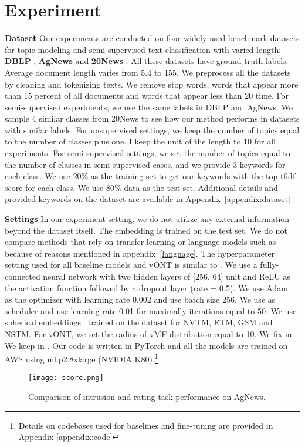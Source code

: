 \documentclass[11pt]{article}
\begin{document}
\section{Experiment}

\textbf{Dataset} Our experiments are conducted on four widely-used benchmark datasets for topic modeling and semi-supervised text classification with varied length: \textbf{DBLP} \cite{DBLP:conf/ijcai/PanWZZW16}, \textbf{AgNews} \cite{zhang2016characterlevel} and \textbf{20News} \cite{lang1995newsweeder}. All these datasets have ground truth labels. Average document length varies from 5.4 to 155. We preprocess all the datasets by cleaning and tokenizing texts. We remove stop words, words that appear more than 15 percent of all documents and words that appear less than 20 time. For semi-supervised experiments, we use the same labels in DBLP and AgNews. We sample 4 similar classes from 20News to see how our method performs in datasets with similar labels. For unsupervised settings, we keep the number of topics equal to the number of classes plus one. I keep the unit of the length to 10 for all experiments. For semi-supervised settings, we set the number of topics equal to the number of classes in semi-supervised cases, and we provide 3 keywords for each class. We use 20\% as the training set to get our keywords with the top tfidf score for each class. We use 80\% data as the test set. Additional details and provided keywords on the dataset are available in Appendix~\ref{appendix:dataset}

\textbf{Settings} In our experiment setting, we do not utilize any external information beyond the dataset itself. The embedding is trained on the test set. We do not compare methods that rely on transfer learning or language models such as \cite{Bianchi2021PretrainingIA, Yu2021FineTuningPL,Wang2021XClassTC} because of reasons mentioned in appendix~\ref{language}.
The hyperparameter setting used for all baseline models and vONT is similar to \cite{JMLR:v20:18-569}. We use a fully-connected neural network with two hidden layers of [256, 64] unit and ReLU as the activation function followed by a dropout layer (rate = 0.5). We use Adam~\cite{kingma2017adam} as the optimizer with learning rate 0.002 and use batch size 256. We use \cite{smith2018superconvergence} as scheduler and use learning rate 0.01 for maximally iterations equal to 50. We use spherical embeddings~\cite{meng2019spherical} trained on the dataset for NVTM, ETM, GSM and NSTM. For vONT, we set the radius of vMF distribution equal to 10. We fix  in  . We keep  in .    
Our code is written in PyTorch and all the models are trained on AWS using ml.p2.8xlarge (NVIDIA K80).\footnote{Details on codebases used for baselines and fine-tuning are provided in Appendix  \ref{appendix:code}}
\begin{figure}
\centering
\texttt{[image: score.png]}
\caption{Comparison of intrusion and rating task performance on AgNews.}
\label{score}
\end{figure}
\end{document}
